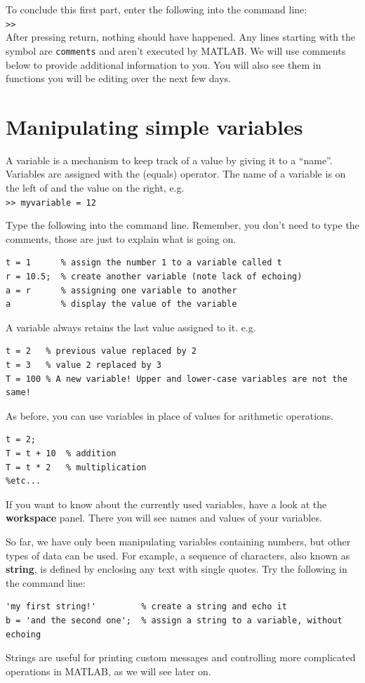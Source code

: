 \documentclass{article}
\begin{document}
To conclude this first part, enter the following into the command line: \\
\verb|>>|  \\
After pressing return, nothing should have happened.
Any lines starting with the \mcode{\%} symbol are \verb|comments| and aren't executed by MATLAB.
We will use comments below to provide additional information to you.
You will also see them in functions you will be editing over the next few days.


\section{Manipulating simple variables}

A variable is a mechanism to keep track of a value by giving it to a ``name''.
Variables are assigned with the \mcode{=} (equals) operator.
The name of a variable is on the left of \mcode{=} and the value on the right, e.g.\\
\verb|>> myvariable = 12|

Type the following into the command line.
Remember, you don't need to type the comments, those are just to explain what is going on.
\begin{lstlisting}
t = 1      % assign the number 1 to a variable called t
r = 10.5;  % create another variable (note lack of echoing)
a = r      % assigning one variable to another
a          % display the value of the variable
\end{lstlisting}

A variable always retains the last value assigned to it. e.g.
\begin{lstlisting}
t = 2   % previous value replaced by 2
t = 3   % value 2 replaced by 3
T = 100 % A new variable! Upper and lower-case variables are not the same!
\end{lstlisting}

As before, you can use variables in place of values for arithmetic operations.
\begin{lstlisting}
t = 2;
T = t + 10  % addition
T = t * 2   % multiplication
%etc...
\end{lstlisting}

If you want to know about the currently used variables, have a look at the \textbf{workspace} panel.
There you will see names and values of your variables.

So far, we have only been manipulating variables containing numbers, but other types of data can be used.
For example, a sequence of characters, also known as \textbf{string}, is defined by enclosing any text with single quotes.
Try the following in the command line:
\begin{lstlisting}
'my first string!'         % create a string and echo it
b = 'and the second one';  % assign a string to a variable, without echoing
\end{lstlisting}
Strings are useful for printing custom messages and controlling more complicated operations in MATLAB, as we will see later on.
\end{document}
